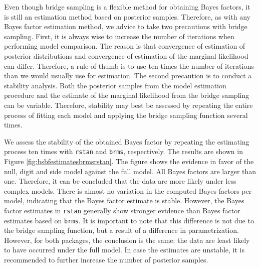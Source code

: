 \documentclass[
  english,
  doc,floatsintext]{apa6}
\newenvironment{Shaded}{\begin{snugshade}}{\end{snugshade}}
\newcommand{\FunctionTok}[1]{\textcolor[rgb]{0.00,0.00,0.00}{#1}}
\newcommand{\NormalTok}[1]{#1}
\newcommand{\SpecialCharTok}[1]{\textcolor[rgb]{0.00,0.00,0.00}{#1}}
\begin{document}
\scriptsize

\begin{Shaded}
\end{Shaded}

\normalsize

Even though bridge sampling is a flexible method for obtaining Bayes factors, it is still an estimation method based on posterior samples. Therefore, as with any Bayes factor estimation method, we advice to take two precautions with bridge sampling. First, it is always wise to increase the number of iterations when performing model comparison. The reason is that convergence of estimation of posterior distributions and convergence of estimation of the marginal likelihood can differ. Therefore, a rule of thumb is to use ten times the number of iterations than we would usually use for estimation. The second precaution is to conduct a stability analysis. Both the posterior samples from the model estimation procedure and the estimate of the marginal likelihood from the bridge sampling can be variable. Therefore, stability may best be assessed by repeating the entire process of fitting each model and applying the bridge sampling function several times.

We assess the stability of the obtained Bayes factor by repeating the estimating process ten times with \texttt{rstan} and \texttt{brms}, respectively. The results are shown in Figure \ref{fig:bsbfestimatesbrmsrstan}. The figure shows the evidence in favor of the null, digit and side model against the full model. All Bayes factors are larger than one. Therefore, it can be concluded that the data are more likely under less complex models. There is almost no variation in the computed Bayes factors per model, indicating that the Bayes factor estimate is stable. However, the Bayes factor estimates in \texttt{rstan} generally show stronger evidence than Bayes factor estimates based on \texttt{brms}. It is important to note that this difference is not due to the bridge sampling function, but a result of a difference in parametrization. However, for both packages, the conclusion is the same: the data are least likely to have occurred under the full model. In case the estimates are unstable, it is recommended to further increase the number of posterior samples.
\end{document}
